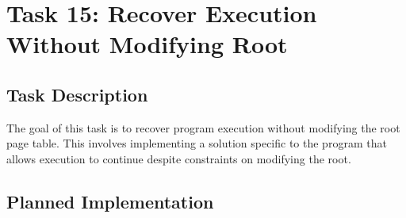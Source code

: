 \documentclass[a4paper,12pt]{report}
\begin{document}
\chapter{Task 15: Recover Execution Without Modifying Root}

\section{Task Description}
The goal of this task is to recover program execution without modifying the root page table. This involves implementing a solution specific to the program that allows execution to continue despite constraints on modifying the root.

\section{Planned Implementation}
\end{document}

